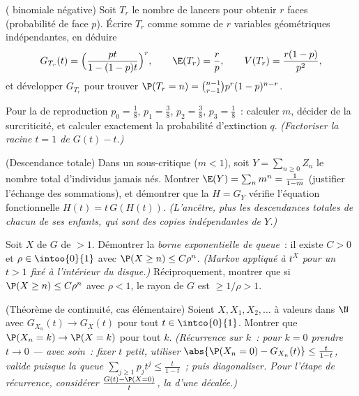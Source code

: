 \begin{exercise}[$\star\star$]\label{exo:b2:genfun:5}
( binomiale négative) Soit $T_r$ le nombre de lancers pour obtenir
$r$ faces (probabilité de face $p$). Écrire $T_r$ comme somme de $r$
variables géométriques indépendantes, en déduire
\[
G_{T_r}(t) = \Bigl(\frac{pt}{1 - (1-p)t}\Bigr)^{r},
\qquad
\E(T_r) = \frac rp,
\qquad
V(T_r) = \frac{r(1-p)}{p^2},
\]
et développer $G_{T_r}$ pour trouver $\P(T_r = n) = \binom{n-1}{r-1}
p^r(1-p)^{n-r}$.
\end{exercise}

\begin{exercise}[$\star\star$]\label{exo:b2:genfun:6}
Pour la  de reproduction $p_0 = \frac18$, $p_1 = \frac38$, $p_2 =
\frac38$, $p_3 = \frac18$~: calculer $m$, décider de la
surcriticité, et calculer exactement la probabilité d'extinction $q$.
\emph{(Factoriser la racine $t = 1$ de $G(t) - t$.)}
\end{exercise}

\begin{exercise}[$\star\star\star$]\label{exo:b2:genfun:7}
(Descendance totale) Dans un  sous-critique
($m < 1$), soit $Y = \sum_{n\geq0} Z_n$ le nombre total d'individus
jamais nés. Montrer $\E(Y) = \sum_n m^n = \frac{1}{1 - m}$ (justifier
l'échange des sommations), et démontrer que la 
$H = G_Y$ vérifie l'équation fonctionnelle $H(t) = t\,G(H(t))$.
\emph{(L'ancêtre, plus les descendances totales de chacun de ses
enfants, qui sont des copies indépendantes de $Y$.)}
\end{exercise}

\begin{exercise}[$\star\star\star$]\label{exo:b2:genfun:8}
Soit $X$ de  $G$ de  $>
1$. Démontrer la \emph{borne exponentielle de queue}~: il existe $C > 0$ et
$\rho \in \intoo{0}{1}$ avec $\P(X \geq n) \leq C\rho^n$.
\emph{(Markov appliqué à $t^X$ pour un $t > 1$ fixé à l'intérieur du
disque.)} Réciproquement, montrer que si $\P(X \geq n) \leq C\rho^n$ avec
$\rho < 1$, le rayon de $G$ est $\geq 1/\rho > 1$.
\end{exercise}

\begin{exercise}[$\star\star\star$]\label{exo:b2:genfun:9}
(Théorème de continuité, cas élémentaire) Soient $X, X_1, X_2, \dots$
à valeurs dans $\N$ avec $G_{X_n}(t) \to G_X(t)$ pour tout $t \in
\intco{0}{1}$. Montrer que $\P(X_n = k) \to \P(X = k)$ pour tout
$k$. \emph{(Récurrence sur $k$~: pour $k = 0$ prendre $t \to 0$ ---
avec soin~: fixer $t$ petit, utiliser $\abs{\P(X_n = 0) - G_{X_n}(t)}
\leq \frac{t}{1-t}$, valide puisque la queue $\sum_{j \geq 1}p_jt^j
\leq \frac{t}{1 - t}$~; puis diagonaliser. Pour l'étape de récurrence,
considérer $\frac{G(t) - \P(X = 0)}{t}$, la  d'une
 décalée.)}
\end{exercise}

